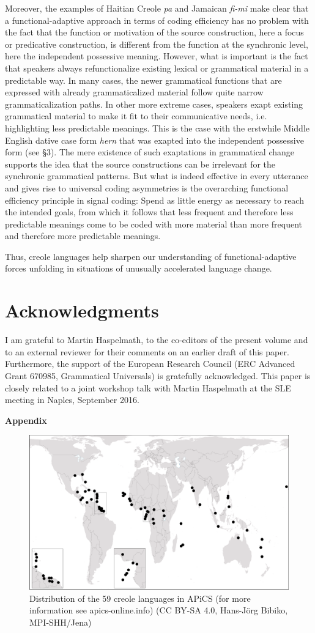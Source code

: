 \documentclass[output=paper]{langsci/langscibook}
\begin{document}
Moreover, the examples of Haitian Creole \textit{pa} and Jamaican \textit{fi-mi} make clear that a functional-adaptive approach in terms of coding efficiency has no problem with the fact that the function or motivation of the source construction, here a focus or predicative construction, is different from the function at the synchronic level, here the independent possessive meaning. However, what is important is the fact that speakers always refunctionalize existing lexical or grammatical material in a predictable way. In many cases, the newer grammatical functions that are expressed with already grammaticalized material follow quite narrow grammaticalization paths. In other more extreme cases, speakers exapt existing grammatical material to make it fit to their communicative needs, i.e. highlighting less predictable meanings. This is the case with the erstwhile Middle English dative case form \textit{hern} that was exapted into the independent possessive form (see §3). The mere existence of such exaptations in grammatical change supports the idea that the source constructions can be irrelevant for the synchronic grammatical patterns. But what is indeed effective in every utterance and gives rise to universal coding asymmetries is the overarching functional efficiency principle in signal coding: Spend as little energy as necessary to reach the intended goals, from which it follows that less frequent and therefore less predictable meanings come to be coded with more material than more frequent and therefore more predictable meanings.

Thus, creole languages help sharpen our understanding of functional-adaptive forces unfolding in situations of unusually accelerated language change.

\section*{Acknowledgments}

I am grateful to Martin Haspelmath, to the co-editors of the present volume and to an external reviewer for their comments on an earlier draft of this paper. Furthermore, the support of the European Research Council (ERC Advanced Grant 670985, Grammatical Universals) is gratefully acknowledged. This paper is closely related to a joint workshop talk with Martin Haspelmath at the SLE meeting in Naples,  {September 2016}.

\textbf{Appendix}

\begin{figure}
\includegraphics[width=\textwidth]{figures/Michaelis-Fig1.png}
\caption{Distribution of the 59 creole languages in APiCS (for more information see apics-online.info) (CC BY-SA 4.0, Hans-Jörg Bibiko, MPI-SHH/Jena)}
\label{fig:michaelis:1}
\end{figure}
\end{document}
